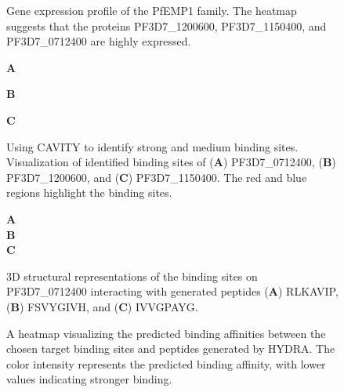 \begin{figure}
  \center


  \caption{Gene expression profile of the PfEMP1 family. The heatmap suggests that the proteins PF3D7\_1200600, PF3D7\_1150400, and PF3D7\_0712400 are highly expressed.}

  \label{fig:application_2}
\end{figure}

\begin{figure}
  \center

  \textbf{\Large A}

  \textbf{\Large B}

  \textbf{\Large C}

  \caption{Using CAVITY to identify strong and medium binding sites. Visualization of identified binding sites of (\textbf{A}) PF3D7\_0712400, (\textbf{B}) PF3D7\_1200600, and (\textbf{C}) PF3D7\_1150400. The red and blue regions highlight the binding sites.}

  \label{fig:application_3}
\end{figure}

\begin{figure}
  \center

  \textbf{\Large A}
   \\
  \textbf{\Large B}
   \\
  \textbf{\Large C}

  \caption{3D structural representations of the binding sites on PF3D7\_0712400 interacting with generated peptides (\textbf{A}) RLKAVIP, (\textbf{B}) FSVYGIVH, and (\textbf{C}) IVVGPAYG.}

  \label{fig:multi_binding_a}
\end{figure}


\begin{figure}
  \center


  \caption{ A heatmap visualizing the predicted binding affinities between the chosen target binding sites and peptides generated by HYDRA. The color intensity represents the predicted binding affinity, with lower values indicating stronger binding.}

  \label{fig:multi_binding_b}
\end{figure}
